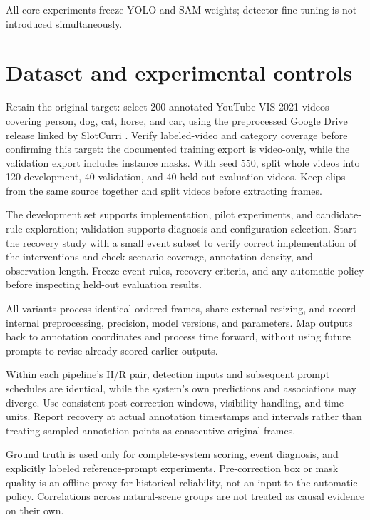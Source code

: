 \documentclass{article}
\begin{document}
All core experiments freeze YOLO and SAM weights; detector fine-tuning is not introduced simultaneously.

\section{Dataset and experimental controls}

Retain the original target: select 200 annotated YouTube-VIS 2021 videos covering person, dog, cat, horse, and car, using the preprocessed Google Drive release linked by SlotCurri \citep{moon2026}. Verify labeled-video and category coverage before confirming this target: the documented training export is video-only, while the validation export includes instance masks. With seed 550, split whole videos into 120 development, 40 validation, and 40 held-out evaluation videos. Keep clips from the same source together and split videos before extracting frames.

The development set supports implementation, pilot experiments, and candidate-rule exploration; validation supports diagnosis and configuration selection. Start the recovery study with a small event subset to verify correct implementation of the interventions and check scenario coverage, annotation density, and observation length. Freeze event rules, recovery criteria, and any automatic policy before inspecting held-out evaluation results.

All variants process identical ordered frames, share external resizing, and record internal preprocessing, precision, model versions, and parameters. Map outputs back to annotation coordinates and process time forward, without using future prompts to revise already-scored earlier outputs.

Within each pipeline's H/R pair, detection inputs and subsequent prompt schedules are identical, while the system's own predictions and associations may diverge. Use consistent post-correction windows, visibility handling, and time units. Report recovery at actual annotation timestamps and intervals rather than treating sampled annotation points as consecutive original frames.

Ground truth is used only for complete-system scoring, event diagnosis, and explicitly labeled reference-prompt experiments. Pre-correction box or mask quality is an offline proxy for historical reliability, not an input to the automatic policy. Correlations across natural-scene groups are not treated as causal evidence on their own.
\end{document}
